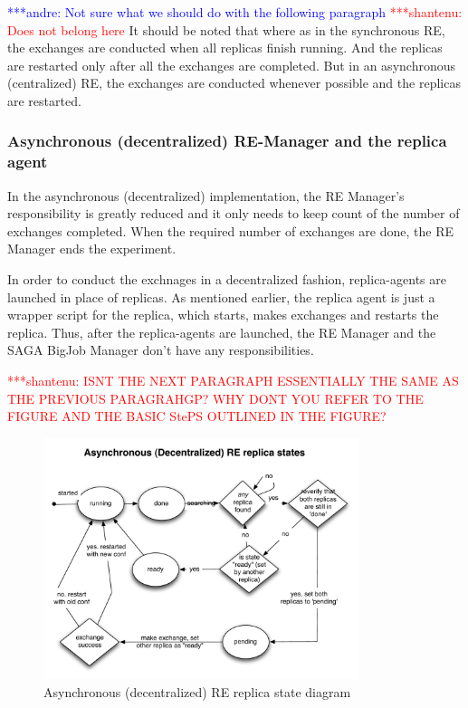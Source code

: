 \documentclass{rspublic}
\newcommand{\jhanote}[1]{ {\textcolor{red} { ***shantenu: #1 }}}
\newcommand{\alnote}[1]{ {\textcolor{blue} { ***andre: #1 }}}
\newcommand{\alnote}[1]{}
\newcommand{\jhanote}[1]{}
\begin{document}
\alnote{Not sure what we should do with the following paragraph}
\jhanote{Does not belong here} It should be noted that where as in the synchronous RE, the
exchanges are conducted when all replicas finish running. And the replicas are restarted only after all the exchanges are completed. But in an asynchronous (centralized) RE, the exchanges are conducted whenever possible and the replicas are restarted. 

\subsubsection{Asynchronous (decentralized) RE-Manager and the replica agent}

In the asynchronous (decentralized) implementation, the RE Manager's responsibility is greatly reduced and it only needs to keep count of the number of exchanges completed. When the required number of exchanges are done, the RE Manager ends the experiment. 

In order to conduct the exchnages in a decentralized fashion, replica-agents are launched in place of replicas. As mentioned earlier, the replica agent is just a wrapper script for the replica, which starts, makes exchanges and restarts the replica. Thus, after the replica-agents are launched, the RE Manager and the SAGA BigJob Manager don't have any responsibilities.  

\jhanote{ISNT THE NEXT PARAGRAPH ESSENTIALLY THE SAME AS THE PREVIOUS
  PARAGRAHGP? WHY DONT YOU REFER TO THE FIGURE AND THE BASIC StePS
  OUTLINED IN THE FIGURE?}
  
\begin{figure}[t]
      \centering
          \includegraphics[width=0.82\textwidth]{../figures/decent_state.pdf}
          \caption{\footnotesize Asynchronous (decentralized) RE replica state diagram
              }
      \label{fig:state}
\end{figure}
\end{document}
